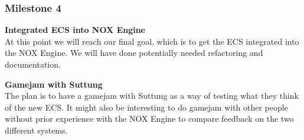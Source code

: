 \subsubsection{Milestone 4}
\noindent\textbf{Integrated ECS into NOX Engine}\\
At this point we will reach our final goal, which is to get the ECS integrated into the NOX Engine.
We will have done potentially needed refactoring and documentation.

\noindent\textbf{Gamejam with Suttung}\\
The plan is to have a gamejam with Suttung as a way of testing what they think of the new ECS.
It might also be interesting to do gamejam with other people without prior experience with the NOX Engine
to compare feedback on the two different systems.
